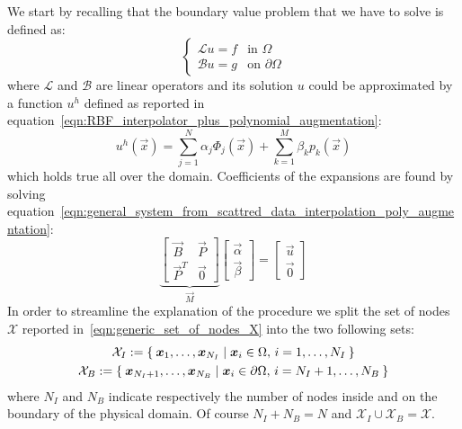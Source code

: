 We start by recalling that the boundary value problem that we have to solve is defined as:
\begin{equation}
	\label{eqn:boundary_value_problem}
	\begin{cases}
		\mathcal{L} u  = f 		 & \text{in $\Omega$} \\
		\mathcal{B} u   = g	     & \text{on $\partial\Omega$}
	\end{cases}
\end{equation}
where $\mathcal{L}$ and $\mathcal{B}$ are linear operators and its solution $u$ could be approximated by a function $u^h$ defined as reported in equation~\eqref{eqn:RBF_interpolator_plus_polynomial_augmentation}:
\begin{equation}
	\label{eqn:Kansa_interpolan}
	u^h(\vec{x}) = \sum_{j=1}^{N} \alpha_j \Phi_j(\vec{x}) + \sum_{k=1}^{M} \beta_k p_k(\vec{x})
\end{equation}
which holds true all over the domain. Coefficients of the expansions are found by solving equation~\eqref{eqn:general_system_from_scattred_data_interpolation_poly_augmentation}:
\begin{equation}
\underbrace{
	\begin{bmatrix}
		\vec{B}  & \vec{P}  \\
		\vec{P}^T  & \vec{0}
	\end{bmatrix}
}_{\vec{M}}
\begin{bmatrix}
	\vec{\alpha}  \\
	\vec{\beta}
\end{bmatrix}
=
\begin{bmatrix}
	\vec{u}  \\
	\vec{0}
\end{bmatrix}
\end{equation}
In order to streamline the explanation of the procedure we split the set of nodes $\mathcal{X}$ reported in~\eqref{eqn:generic_set_of_nodes_X} into the two following sets:
\begin{subequations}
	\begin{gather}
		\mathcal{X}_I := \Set{\boldsymbol{x}_1, \dots, \boldsymbol{x}_{N_I} \mid \boldsymbol{x}_i \in \Omega, \, i=1, \dots, N_I}  \\
		\mathcal{X}_B := \Set{\boldsymbol{x}_{N_I+1}, \dots, \boldsymbol{x}_{N_B} \mid \boldsymbol{x}_i \in \partial\Omega, \, i=N_I+1, \dots, N_B}
	\end{gather}
\end{subequations}
where $N_I$ and $N_B$ indicate respectively the number of nodes inside and on the boundary of the physical domain. Of course $N_I+N_B = N$ and $\mathcal{X}_I \cup \mathcal{X}_B = \mathcal{X}$.

